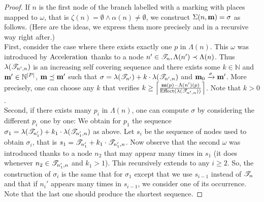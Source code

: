 \begin{proof}
  If $n$ is the first node of the branch labelled with a marking with places mapped to $\omega$,
  that is $\zeta(n) = \emptyset \wedge \alpha(n) \neq \emptyset$,
  we construct $\Sigma(n, \mathbf{m}) = \sigma$ as follows.
  (Here are the ideas, we express them more precisely and in a recursive way right after.)\\
  First, consider the case where there exists exactly one \oplace $p$ in $\Lambda(n)$.
  This $\omega$ was introduced by $\operatorname{Acceleration}$ thanks to a node $n' \in \mathscr{T}_{n}, \Lambda(n') \prec \Lambda(n)$.
  Thus $\lambda(\mathscr{T}_{n',n})$ is an increasing self covering sequence
  and
  there exists some $k \in \mathbb{N}$ and $\mathbf{m'} \in \mathbb{N}^{|P|}$, $\mathbf{m} \preceq \mathbf{m'}$
  such that
  $\sigma = \lambda(\mathscr{T}_{n'}) + k \cdot \lambda(\mathscr{T}_{n',n})$ and $\mathbf{m}_0 \xrightarrow{\sigma} \mathbf{m'}$. %
  More precisely, one can choose any $k$ that verifies $k \geq \left\lceil\frac{\mathbf{m}(p) - \Lambda(n')(p)}{\operatorname{Effect}(\lambda(\mathscr{T}_{n',n}))}\right\rceil$. %
  Note that $k > 0$.\\
  Second, if there exists many \oplaces $p_i$ in $\Lambda(n)$, one can compute $\sigma$ by considering the different $p_i$ one by one:
  We obtain for $p_1$ the sequence $\sigma_1 = \lambda(\mathscr{T}_{n_1'}) + k_1 \cdot \lambda(\mathscr{T}_{n_1',n})$ as above.
  Let $s_i$ be the sequence of nodes used to obtain $\sigma_i$, that is $s_1 = \mathscr{T}_{n_1'} + k_1 \cdot \mathscr{T}_{n_1',n}$.
  Now observe that
  the second $\omega$ was introduced thanks to a node $n_2$ that may appear many times in $s_1$ (it does whenever $n_2 \in \mathscr{T}_{n_1',n}$ and $k_1 > 1$).
  This recursively extends to any $i \geq 2$.
  So, the construction of $\sigma_i$ is the same that for $\sigma_1$ except that we use $s_{i-1}$ instead of $\mathscr{T}_{n}$ and that if $n_i'$ appears many times in $s_{i-1}$, we consider one of its occurrence. Note that the last one should produce the shortest sequence.%


\end{proof}
